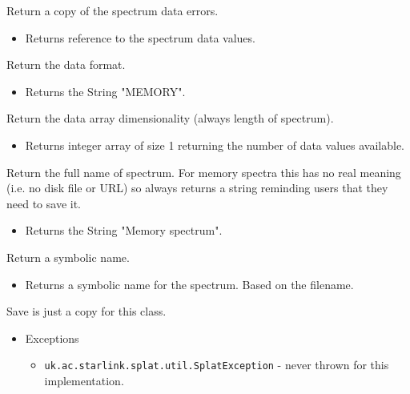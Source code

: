 \begin{desc}Return a copy of the spectrum data errors.
\begin{itemize}
\item{Returns reference to the spectrum data values. }
\end{itemize}
\end{desc}

\begin{desc}Return the data format.
\begin{itemize}
\item{Returns the String "MEMORY". }
\end{itemize}
\end{desc}

\begin{desc}Return the data array dimensionality (always length of
 spectrum).
\begin{itemize}
\item{Returns integer array of size 1 returning the number of data
                 values available. }
\end{itemize}
\end{desc}

\begin{desc}Return the full name of spectrum. For memory spectra this has
 no real meaning (i.e. no disk file or URL) so always returns a
 string reminding users that they need to save it.
\begin{itemize}
\item{Returns the String "Memory spectrum". }
\end{itemize}
\end{desc}

\begin{desc}Return a symbolic name.
\begin{itemize}
\item{Returns a symbolic name for the spectrum. Based on the filename. }
\end{itemize}
\end{desc}

\begin{desc}Save is just a copy for this class.
\begin{itemize}
\item{{Exceptions}
  \begin{itemize}
   \item{\vspace{-.6ex}\texttt{uk.ac.starlink.splat.util.SplatException} - never thrown for this implementation.}
  \end{itemize}
}
\end{itemize}
\end{desc}

